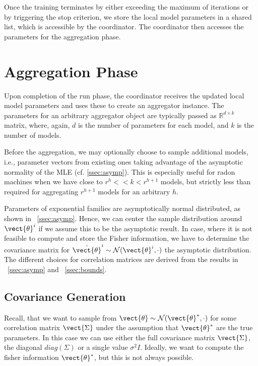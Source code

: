 Once the training terminates by either exceeding the maximum of iterations or by triggering the stop criterion, we store the local model parameters in a shared list, which is accessible by the coordinator. 
The coordinator then accesses the parameters for the aggregation phase.


\section{Aggregation Phase}
Upon completion of the run phase, the coordinator receives the updated local model parameters and uses these to create an aggregator instance.
The parameters for an arbitrary aggregator object are typically passed as $\mathbb{R}^{d \times k}$ matrix, where, again, $d$ is the number of parameters for each model, and $k$ is the number of models.

Before the aggregation, we may optionally choose to sample additional models, i.e., parameter vectors from existing ones taking advantage of the asymptotic normality of the MLE (cf. \ref{ssec:asymp}).
This is especially useful for radon machines when we have close to $ r^h << k < r^{h+1}$ models, but strictly less than required for aggregating $r^{h+1}$ models for an arbitrary $h$.

Parameters of exponential families are asymptotically normal distributed, as shown in \sect~\ref{ssec:asymp}.
Hence, we can center the sample distribution around $\vect{\theta}^i$ if we assume this to be the asymptotic result.
In case, where it is not feasible to compute and store the Fisher information, we have to determine the covariance matrix for $\hat{\vect{\theta}}^i \sim \mathcal{N}(\vect{\theta}^i, \cdot)$ the asymptotic distribution.
The different choices for correlation matrices are derived from the results in \sect~\ref{ssec:asymp} and \sect~\ref{ssec:bounds}.

\subsection{Covariance Generation}
\label{ssec:covgen}

Recall, that we want to sample from $\vect{\theta} \sim \mathcal{N}(\vect{\theta}^*, \cdot)$ for some correlation matrix $\vect{\Sigma}$ under the assumption that $\vect{\theta}^*$ are the true parameters.
In this case we can use either the full covariance matrix $\vect{\Sigma}$, the diagonal $diag(\Sigma)$ or a single value $\sigma^2 I$.
Ideally, we want to compute the fisher information \wrt $\vect{\theta}^*$, but this is not always possible.

